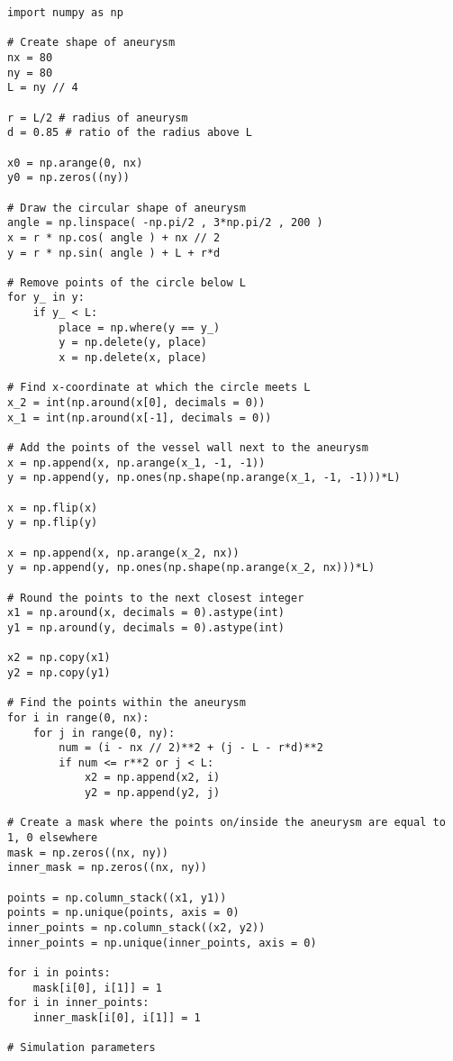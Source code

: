 \begin{mdframed}[backgroundcolor=red!10, linecolor=red!10]
\begin{verbatim}
import numpy as np

# Create shape of aneurysm
nx = 80
ny = 80
L = ny // 4

r = L/2 # radius of aneurysm
d = 0.85 # ratio of the radius above L

x0 = np.arange(0, nx)
y0 = np.zeros((ny))

# Draw the circular shape of aneurysm
angle = np.linspace( -np.pi/2 , 3*np.pi/2 , 200 ) 
x = r * np.cos( angle ) + nx // 2
y = r * np.sin( angle ) + L + r*d

# Remove points of the circle below L
for y_ in y:
    if y_ < L:
        place = np.where(y == y_)
        y = np.delete(y, place)
        x = np.delete(x, place)

# Find x-coordinate at which the circle meets L
x_2 = int(np.around(x[0], decimals = 0))
x_1 = int(np.around(x[-1], decimals = 0))

# Add the points of the vessel wall next to the aneurysm
x = np.append(x, np.arange(x_1, -1, -1))
y = np.append(y, np.ones(np.shape(np.arange(x_1, -1, -1)))*L)

x = np.flip(x)
y = np.flip(y)

x = np.append(x, np.arange(x_2, nx))
y = np.append(y, np.ones(np.shape(np.arange(x_2, nx)))*L)

# Round the points to the next closest integer
x1 = np.around(x, decimals = 0).astype(int)
y1 = np.around(y, decimals = 0).astype(int)

x2 = np.copy(x1)
y2 = np.copy(y1)

# Find the points within the aneurysm
for i in range(0, nx):
    for j in range(0, ny):
        num = (i - nx // 2)**2 + (j - L - r*d)**2
        if num <= r**2 or j < L:
            x2 = np.append(x2, i)
            y2 = np.append(y2, j)

# Create a mask where the points on/inside the aneurysm are equal to 1, 0 elsewhere
mask = np.zeros((nx, ny))
inner_mask = np.zeros((nx, ny))

points = np.column_stack((x1, y1))
points = np.unique(points, axis = 0)
inner_points = np.column_stack((x2, y2))
inner_points = np.unique(inner_points, axis = 0)

for i in points:
    mask[i[0], i[1]] = 1
for i in inner_points:
    inner_mask[i[0], i[1]] = 1

# Simulation parameters


\end{verbatim}
\end{mdframed}
